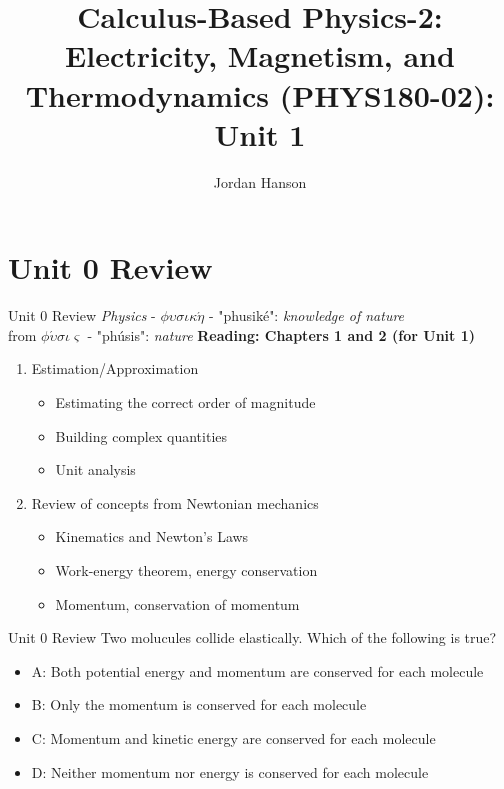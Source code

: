 \documentclass{beamer}
\title{Calculus-Based Physics-2: Electricity, Magnetism, and Thermodynamics (PHYS180-02): Unit 1}
\author{Jordan Hanson}
\institute{Whittier College Department of Physics and Astronomy}
\begin{document}
\maketitle

\section{Unit 0 Review}

\begin{frame}{Unit 0 Review}
\textit{Physics} - $\phi\upsilon\sigma\iota\kappa\acute{\eta}$ - "phusik\'e": \textit{knowledge of nature} \\
from $\phi\acute{\upsilon}\sigma\iota\varsigma$ - "ph\'usis": \textit{nature}
\textbf{Reading: Chapters 1 and 2 (for Unit 1)}
\begin{enumerate}
\item Estimation/Approximation
\begin{itemize}
\item \alert{Estimating} the correct order of magnitude
\item \alert{Building} complex quantities
\item \alert{Unit analysis}
\end{itemize}
\item Review of concepts from Newtonian mechanics
\begin{itemize}
\item Kinematics and \alert{Newton's Laws}
\item Work-energy theorem, energy conservation
\item Momentum, conservation of momentum
\end{itemize}
\end{enumerate}
\end{frame}

\begin{frame}{Unit 0 Review}
Two molucules collide elastically.  Which of the following is true?
\begin{itemize}
\item A: Both potential energy and momentum are conserved for each molecule
\item B: Only the momentum is conserved for each molecule
\item C: Momentum and kinetic energy are conserved for each molecule
\item D: Neither momentum nor energy is conserved for each molecule
\end{itemize}
\end{frame}
\end{document}
